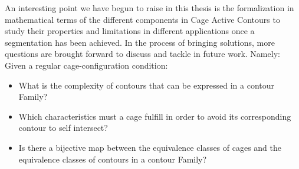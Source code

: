 An interesting point we have begun to raise in this thesis is the formalization in mathematical terms of the different components in Cage Active Contours to study their properties and limitations in different applications once a segmentation has been achieved. In the process of bringing solutions, more questions are brought forward to discuss and tackle in future work. Namely: \\
Given a regular cage-configuration condition:
\begin{itemize}
	\item What is the complexity of contours that can be expressed in a contour Family?
	\item Which characteristics must a cage fulfill in order to avoid its corresponding contour to self intersect?
	\item Is there a bijective map between the equivalence classes of cages and the equivalence classes of contours in a contour Family?
\end{itemize}


